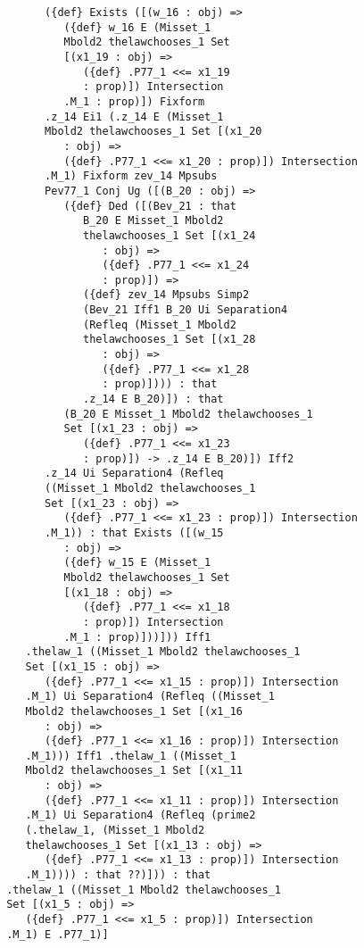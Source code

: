 \documentclass[12pt]{article}
\begin{document}
\begin{verbatim}
             ({def} Exists ([(w_16 : obj) => 
                ({def} w_16 E (Misset_1 
                Mbold2 thelawchooses_1 Set 
                [(x1_19 : obj) => 
                   ({def} .P77_1 <<= x1_19 
                   : prop)]) Intersection 
                .M_1 : prop)]) Fixform 
             .z_14 Ei1 (.z_14 E (Misset_1 
             Mbold2 thelawchooses_1 Set [(x1_20 
                : obj) => 
                ({def} .P77_1 <<= x1_20 : prop)]) Intersection 
             .M_1) Fixform zev_14 Mpsubs 
             Pev77_1 Conj Ug ([(B_20 : obj) => 
                ({def} Ded ([(Bev_21 : that 
                   B_20 E Misset_1 Mbold2 
                   thelawchooses_1 Set [(x1_24 
                      : obj) => 
                      ({def} .P77_1 <<= x1_24 
                      : prop)]) => 
                   ({def} zev_14 Mpsubs Simp2 
                   (Bev_21 Iff1 B_20 Ui Separation4 
                   (Refleq (Misset_1 Mbold2 
                   thelawchooses_1 Set [(x1_28 
                      : obj) => 
                      ({def} .P77_1 <<= x1_28 
                      : prop)]))) : that 
                   .z_14 E B_20)]) : that 
                (B_20 E Misset_1 Mbold2 thelawchooses_1 
                Set [(x1_23 : obj) => 
                   ({def} .P77_1 <<= x1_23 
                   : prop)]) -> .z_14 E B_20)]) Iff2 
             .z_14 Ui Separation4 (Refleq 
             ((Misset_1 Mbold2 thelawchooses_1 
             Set [(x1_23 : obj) => 
                ({def} .P77_1 <<= x1_23 : prop)]) Intersection 
             .M_1)) : that Exists ([(w_15 
                : obj) => 
                ({def} w_15 E (Misset_1 
                Mbold2 thelawchooses_1 Set 
                [(x1_18 : obj) => 
                   ({def} .P77_1 <<= x1_18 
                   : prop)]) Intersection 
                .M_1 : prop)]))])) Iff1 
          .thelaw_1 ((Misset_1 Mbold2 thelawchooses_1 
          Set [(x1_15 : obj) => 
             ({def} .P77_1 <<= x1_15 : prop)]) Intersection 
          .M_1) Ui Separation4 (Refleq ((Misset_1 
          Mbold2 thelawchooses_1 Set [(x1_16 
             : obj) => 
             ({def} .P77_1 <<= x1_16 : prop)]) Intersection 
          .M_1))) Iff1 .thelaw_1 ((Misset_1 
          Mbold2 thelawchooses_1 Set [(x1_11 
             : obj) => 
             ({def} .P77_1 <<= x1_11 : prop)]) Intersection 
          .M_1) Ui Separation4 (Refleq (prime2 
          (.thelaw_1, (Misset_1 Mbold2 
          thelawchooses_1 Set [(x1_13 : obj) => 
             ({def} .P77_1 <<= x1_13 : prop)]) Intersection 
          .M_1)))) : that ??)])) : that 
       .thelaw_1 ((Misset_1 Mbold2 thelawchooses_1 
       Set [(x1_5 : obj) => 
          ({def} .P77_1 <<= x1_5 : prop)]) Intersection 
       .M_1) E .P77_1)]


\end{verbatim}
\end{document}
